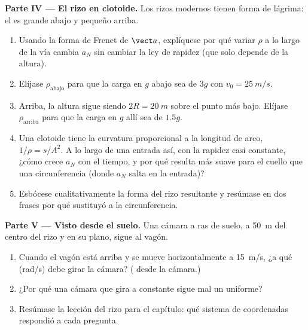 \begin{problem}
\medskip
\noindent\textbf{Parte IV --- El rizo en clotoide.}
Los rizos modernos tienen forma de lágrima: el  es
grande abajo y pequeño arriba.
\begin{enumerate}[resume]
  \item Usando la forma de Frenet de $\vect a$, explíquese por qué variar
        $\rho$ a lo largo de la vía cambia $a_N$ sin cambiar la ley de
        rapidez (que solo depende de la altura).
  \item Elíjase $\rho_{\text{abajo}}$ para que la carga en $g$ abajo sea
        de $3g$ con $v_0 = \qty{25}{m/s}$.
  \item Arriba, la altura sigue siendo $2R = \qty{20}{m}$ sobre el punto
        más bajo. Elíjase $\rho_{\text{arriba}}$ para que la carga en $g$
        allí sea de $1.5g$.
  \item Una clotoide tiene la curvatura proporcional a la longitud de
        arco, $1/\rho = s/A^2$. A lo largo de una entrada así, con la
        rapidez casi constante, ¿cómo crece $a_N$ con el tiempo, y por qué
        resulta más suave para el cuello que una circunferencia (donde
        $a_N$ salta en la entrada)?
  \item Esbócese cualitativamente la forma del rizo resultante y
        resúmase en dos frases por qué sustituyó a la circunferencia.
\end{enumerate}

\medskip
\noindent\textbf{Parte V --- Visto desde el suelo.}
Una cámara a ras de suelo, a \qty{50}{m} del centro del rizo y en su
plano, sigue al vagón.
\begin{enumerate}[resume]
  \item Cuando el vagón está arriba y se mueve horizontalmente a
        \qty{15}{m/s}, ¿a qué  (rad/s) debe girar la
        cámara? ( desde la cámara.)
  \item ¿Por qué una cámara que gira a  constante sigue mal un
         uniforme?
  \item Resúmase la lección del rizo para el capítulo: qué sistema de
        coordenadas respondió a cada pregunta.
\end{enumerate}
\end{problem}
